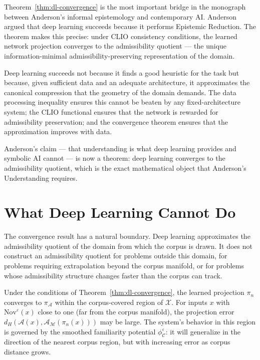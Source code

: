 \documentclass[12pt, a4paper, oneside]{book}
\newcommand{\Adm}{\mathcal{A}}
\newcommand{\X}{\mathcal{X}}
\newcommand{\M}{\mathcal{M}}
\newcommand{\C}{\mathcal{C}}
\newcommand{\proj}{\pi}
\newcommand{\projA}{\pi_{\!\Adm}}
\newcommand{\dH}{d_H}
\newcommand{\Nov}{\mathrm{Nov}}
\newcommand{\phiCe}{\phi_{\C}^{\varepsilon}}
\begin{document}
\begin{remark}
Theorem~\ref{thm:dl-convergence} is the most important bridge in the
monograph between Anderson's informal epistemology and contemporary AI.
Anderson argued that deep learning succeeds because it performs
Epistemic Reduction. The theorem makes this precise: under CLIO
consistency conditions, the learned network projection converges to the
admissibility quotient --- the unique information-minimal
admissibility-preserving representation of the domain.

Deep learning succeeds not because it finds a good heuristic for the
task but because, given sufficient data and an adequate architecture,
it approximates the canonical compression that the geometry of the
domain demands. The data processing inequality ensures this cannot be
beaten by any fixed-architecture system; the CLIO functional ensures
that the network is rewarded for admissibility preservation; and the
convergence theorem ensures that the approximation improves with data.

Anderson's claim --- that understanding is what deep learning provides
and symbolic AI cannot --- is now a theorem: deep learning converges to
the admissibility quotient, which is the exact mathematical object that
Anderson's Understanding requires.
\end{remark}

\section{What Deep Learning Cannot Do}

The convergence result has a natural boundary. Deep learning approximates
the admissibility quotient of the domain from which the corpus is drawn.
It does not construct an admissibility quotient for problems outside this
domain, for problems requiring extrapolation beyond the corpus manifold,
or for problems whose admissibility structure changes faster than the
corpus can track.

\begin{corollary}
\label{cor:gen-boundary}
Under the conditions of Theorem~\ref{thm:dl-convergence}, the learned
projection $\proj_n$ converges to $\projA$ within the corpus-covered
region of $\X$. For inputs $x$ with $\Nov^\varepsilon(x)$ close to one
(far from the corpus manifold), the projection error
$\dH(\Adm(x), \Adm_{\M}(\proj_n(x)))$ may be large.
The system's behavior in this region is governed by the smoothed
familiarity potential $\phiCe$: it will generalize in the direction of
the nearest corpus region, but with increasing error as corpus distance
grows.
\end{corollary}
\end{document}
